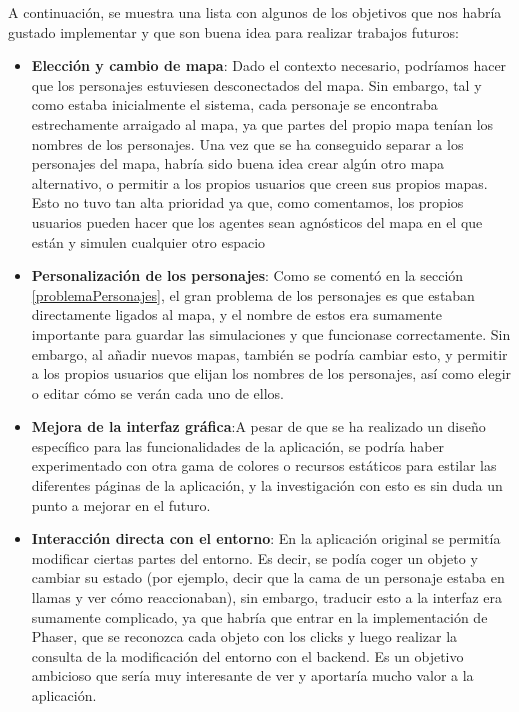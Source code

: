 A continuación, se muestra una lista con algunos de los objetivos que nos habría gustado implementar y que son buena idea para realizar trabajos futuros:

\begin{itemize}
	\item \textbf{Elección y cambio de mapa}: Dado el contexto necesario, podríamos hacer que los personajes estuviesen desconectados del mapa. Sin embargo, tal y como estaba inicialmente el sistema, cada personaje se encontraba estrechamente arraigado al mapa, ya que partes del propio mapa tenían los nombres de los personajes. Una vez que se ha conseguido separar a los personajes del mapa, habría sido buena idea crear algún otro mapa alternativo, o permitir a los propios usuarios que creen sus propios mapas. Esto no tuvo tan alta prioridad ya que, como comentamos, los propios usuarios pueden hacer que los agentes sean agnósticos del mapa en el que están y simulen cualquier otro espacio
	
	\item \textbf{Personalización de los personajes}: Como se comentó en la sección \ref{problemaPersonajes}, el gran problema de los personajes es que estaban directamente ligados al mapa, y el nombre de estos era sumamente importante para guardar las simulaciones y que funcionase correctamente. Sin embargo, al añadir nuevos mapas, también se podría cambiar esto, y permitir a los propios usuarios que elijan los nombres de los personajes, así como elegir o editar cómo se verán cada uno de ellos.
	
	\item \textbf{Mejora de la interfaz gráfica}:A pesar de que se ha realizado un diseño específico para las funcionalidades de la aplicación, se podría haber experimentado con otra gama de colores o recursos estáticos para estilar las diferentes páginas de la aplicación, y la investigación con esto es sin duda un punto a mejorar en el futuro.
	
	\item \textbf{Interacción directa con el entorno}: En la aplicación original se permitía modificar ciertas partes del entorno. Es decir, se podía coger un objeto y cambiar su estado (por ejemplo, decir que la cama de un personaje estaba en llamas y ver cómo reaccionaban), sin embargo, traducir esto a la interfaz era sumamente complicado, ya que habría que entrar en la implementación de Phaser, que se reconozca cada objeto con los clicks y luego realizar la consulta de la modificación del entorno con el backend. Es un objetivo ambicioso que sería muy interesante de ver y aportaría mucho valor a la aplicación.
	

\end{itemize}
